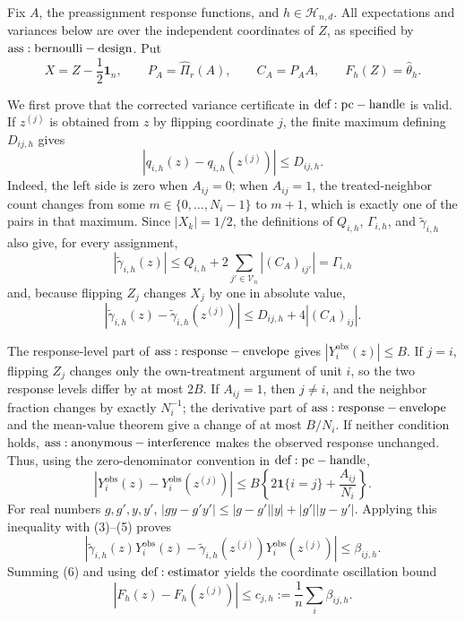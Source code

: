 Fix \(A\), the preassignment response functions, and \(h\in\mathcal H_{n,d}\).  All expectations and variances below are over the independent coordinates of \(Z\), as specified by \({\rm ass:bernoulli-design}\).  Put
\[
 X=Z-\frac12\mathbf1_n,\qquad P_A=\widehat\Pi_r(A),\qquad C_A=P_AA,
 \qquad F_h(Z)=\widehat\theta_h.
\tag{1}
\]

We first prove that the corrected variance certificate in \({\rm def:pc-handle}\) is valid.  If \(z^{(j)}\) is obtained from \(z\) by flipping coordinate \(j\), the finite maximum defining \(D_{ij,h}\) gives
\[
 |q_{i,h}(z)-q_{i,h}(z^{(j)})|\le D_{ij,h}.
\tag{2}
\]
Indeed, the left side is zero when \(A_{ij}=0\); when \(A_{ij}=1\), the treated-neighbor count changes from some \(m\in\{0,\ldots,N_i-1\}\) to \(m+1\), which is exactly one of the pairs in that maximum.  Since \(|X_k|=1/2\), the definitions of \(Q_{i,h}\), \(\Gamma_{i,h}\), and \(\widetilde\gamma_{i,h}\) also give, for every assignment,
\[
 |\widetilde\gamma_{i,h}(z)|\le Q_{i,h}+2\sum_{j'\in\mathcal V_n}|(C_A)_{ij'}|=\Gamma_{i,h}
\tag{3}
\]
and, because flipping \(Z_j\) changes \(X_j\) by one in absolute value,
\[
 |\widetilde\gamma_{i,h}(z)-\widetilde\gamma_{i,h}(z^{(j)})|
 \le D_{ij,h}+4|(C_A)_{ij}|.
\tag{4}
\]

The response-level part of \({\rm ass:response-envelope}\) gives \(|Y_i^{\mathrm{obs}}(z)|\le B\).  If \(j=i\), flipping \(Z_j\) changes only the own-treatment argument of unit \(i\), so the two response levels differ by at most \(2B\).  If \(A_{ij}=1\), then \(j\ne i\), and the neighbor fraction changes by exactly \(N_i^{-1}\); the derivative part of \({\rm ass:response-envelope}\) and the mean-value theorem give a change of at most \(B/N_i\).  If neither condition holds, \({\rm ass:anonymous-interference}\) makes the observed response unchanged.  Thus, using the zero-denominator convention in \({\rm def:pc-handle}\),
\[
 |Y_i^{\mathrm{obs}}(z)-Y_i^{\mathrm{obs}}(z^{(j)})|
 \le B\left\{2\mathbf1\{i=j\}+\frac{A_{ij}}{N_i}\right\}.
\tag{5}
\]
For real numbers \(g,g',y,y'\), \(|gy-g'y'|\le |g-g'||y|+|g'||y-y'|\).  Applying this inequality with (3)--(5) proves
\[
 \left|\widetilde\gamma_{i,h}(z)Y_i^{\mathrm{obs}}(z)
 -\widetilde\gamma_{i,h}(z^{(j)})Y_i^{\mathrm{obs}}(z^{(j)})\right|
 \le\beta_{ij,h}.
\tag{6}
\]
Summing (6) and using \({\rm def:estimator}\) yields the coordinate oscillation bound
\[
 |F_h(z)-F_h(z^{(j)})|
 \le c_{j,h}:=\frac1n\sum_i\beta_{ij,h}.
\tag{7}
\]

